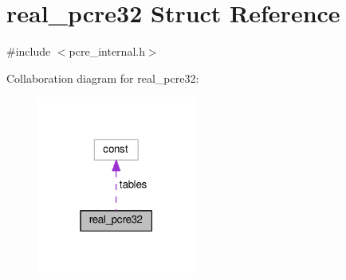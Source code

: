 \hypertarget{structreal__pcre32}{}\section{real\+\_\+pcre32 Struct Reference}
\label{structreal__pcre32}


{\ttfamily \#include $<$pcre\+\_\+internal.\+h$>$}



Collaboration diagram for real\+\_\+pcre32\+:
\nopagebreak
\begin{figure}[H]
\begin{center}
\leavevmode
\includegraphics[width=147pt]{structreal__pcre32__coll__graph}
\end{center}
\end{figure}
